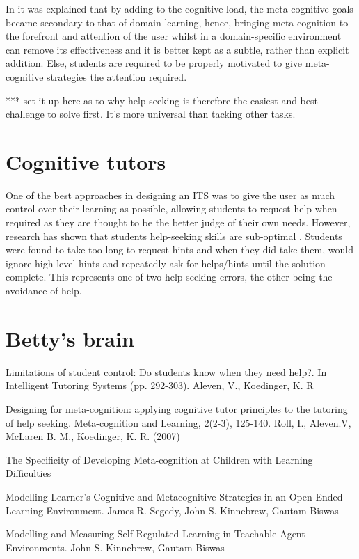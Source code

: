 \documentclass[11pt]{article}
\begin{document}
In \cite{designmeta} it was explained that by adding to the cognitive load, the meta-cognitive goals became secondary to that of domain learning, hence, bringing meta-cognition to the forefront and attention of the user whilst in a domain-specific environment can remove its effectiveness and it is better kept as a subtle, rather than explicit addition. Else, students are required to be properly motivated to give meta-cognitive strategies the attention required. 

*** set it up here as to why help-seeking is therefore the easiest and best challenge to solve first. It's more universal than tacking other tasks.

\section{Cognitive tutors}

One of the best approaches in designing an ITS was to give the user as much control over their learning as possible, allowing students to request help when required as they are thought to be the better judge of their own needs. However, research has shown that students help-seeking skills are sub-optimal \cite{studenthelp}. Students were found to take too long to request hints and when they did take them, would ignore high-level hints and repeatedly ask for helps/hints until the solution complete. This represents one of two help-seeking errors, the other being the avoidance of help. 

\section{Betty's brain}


\begin{thebibliography}{9}

Limitations of student control: Do students know when they need help?. In Intelligent Tutoring Systems (pp. 292-303). Aleven, V., Koedinger, K. R

Designing for meta-cognition: applying cognitive tutor principles to the tutoring of help seeking. Meta-cognition and Learning, 2(2-3), 125-140. Roll, I., Aleven.V, McLaren B. M., Koedinger, K. R. (2007)

The Specificity of Developing Meta-cognition at Children with Learning Difficulties 

Modelling Learner’s Cognitive and Metacognitive Strategies in an Open-Ended Learning Environment. James R. Segedy, John S. Kinnebrew, Gautam Biswas

Modelling and Measuring Self-Regulated Learning in Teachable Agent Environments. John S. Kinnebrew, Gautam Biswas


\end{thebibliography}
\end{document}

